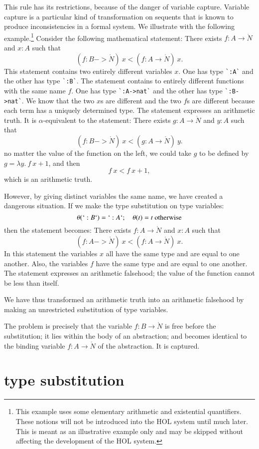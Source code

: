 This rule has its restrictions, because of the danger of variable capture.  Variable capture is a particular kind of transformation on sequents that is known to produce inconsistencies in a formal system.  We illustrate with the following example.\footnote{This example uses some elementary arithmetic and existential quantifiers.  These notions will not be introduced into the HOL system until much later.  This is meant as an illustrative example only and may be skipped without affecting the development of the HOL system.}  Consider the following mathematical statement: There exists $f:A\to\ring{N}$ and $x:A$ such that
$$
(f:B->\ring{N})~x < (f:A\to\ring{N})~x.
$$
This statement contains two entirely different variables $x$.  One has type \verb!`:A`! and the other has type \verb!`:B`!.  The statement contains to entirely different functions with the same name $f$.  One has type \verb!`:A->nat`! and the other has type \verb!`:B->nat`!.  We know that the two $x$s are different and the two $f$s are different because each term has a uniquely determined type.  The statement expresses an arithmetic truth.  It is $\alpha$-equivalent to the statement: 
There exists $g:A\to\ring{N}$ and $y:A$ such that
$$
(f:B->\ring{N})~x < (g:A\to\ring{N})~y.
$$
no matter the value of the function on the left, we could take $g$ to be defined by $g = \lambda y.~f~x + 1$, and then
$$
f~x < f~x + 1,
$$
which is an arithmetic truth.

However, by giving distinct variables the same name, we have created a dangerous situation.  If we make the type substitution on type variables:
$$
\theta(`:B`) = `:A`;\quad \theta(t)=t\hbox{ otherwise}
$$
then the statement becomes:
There exists $f:A\to\ring{N}$ and $x:A$ such that
$$
(f:A->\ring{N})~x < (f:A\to\ring{N})~x.
$$
In this statement the variables $x$ all have the same type and are equal to one another.  Also, the variables $f$ have the same type and are equal to one another.  The statement expresses an arithmetic falsehood; the value of the function cannot be less than itself.

We have thus transformed an arithmetic truth into an arithmetic falsehood by making an unrestricted substitution of type variables.

The problem is precisely that the variable $f:B\to \ring{N}$ is free before the substitution; it lies within the body of an abstraction; and becomes identical to the binding variable $f:A\to\ring{N}$ of the abstraction.  It is captured.


\section{type substitution}

